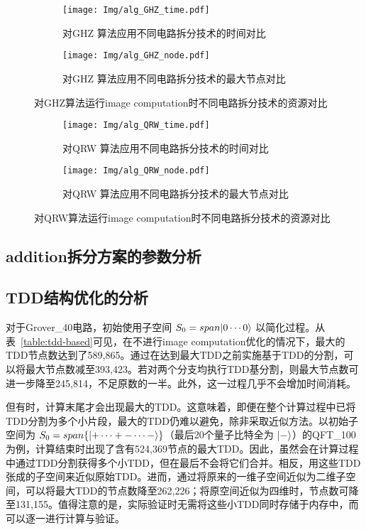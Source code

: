 \begin{figure}[!htbp]
    \centering
    \begin{subfigure}[b]{.4\textwidth}
        \centering
        \texttt{[image: Img/alg\_GHZ\_time.pdf]}
        \caption{对GHZ 算法应用不同电路拆分技术的时间对比}
        \label{fig:GHZ-time}
    \end{subfigure}
    \qquad
    \begin{subfigure}[b]{.4\textwidth}
        \centering
        \texttt{[image: Img/alg\_GHZ\_node.pdf]}
        \caption{对GHZ 算法应用不同电路拆分技术的最大节点对比}
        \label{fig:GHZ-node}
    \end{subfigure}
    \caption{对GHZ算法运行image computation时不同电路拆分技术的资源对比}
    \label{fig:GHZ-compare}
\end{figure}
\begin{figure}[!htbp]
    \centering
    \begin{subfigure}[b]{.4\textwidth}
        \centering
        \texttt{[image: Img/alg\_QRW\_time.pdf]}
        \caption{对QRW 算法应用不同电路拆分技术的时间对比}
        \label{fig:QRW-time}
    \end{subfigure}
    \qquad
    \begin{subfigure}[b]{.4\textwidth}
        \centering
        \texttt{[image: Img/alg\_QRW\_node.pdf]}
        \caption{对QRW 算法应用不同电路拆分技术的最大节点对比}
        \label{fig:QRW-node}
    \end{subfigure}
    \caption{对QRW算法运行image computation时不同电路拆分技术的资源对比}
    \label{fig:QRW-compare}
\end{figure}

\subsection*{addition拆分方案的参数分析}

\subsection*{TDD结构优化的分析}
对于Grover\_40电路，初始使用子空间 $S_0=span{\ket{0\cdots0}}$ 以简化过程。从表~\ref{table:tdd-based}可见，在不进行image computation优化的情况下，最大的TDD节点数达到了589,865。通过在达到最大TDD之前实施基于TDD的分割，可以将最大节点数减至393,423。若对两个分支均执行TDD基分割，则最大节点数可进一步降至245,814，不足原数的一半。此外，这一过程几乎不会增加时间消耗。
    
但有时，计算末尾才会出现最大的TDD。这意味着，即便在整个计算过程中已将TDD分割为多个小片段，最大的TDD仍难以避免，除非采取近似方法。以初始子空间为 $S_0=span\{\ket{+\cdots+ -\cdots -}\}$（最后20个量子比特全为 $\ket{-}$）的QFT\_100为例，计算结束时出现了含有524,369节点的最大TDD。因此，虽然会在计算过程中通过TDD分割获得多个小TDD，但在最后不会将它们合并。相反，用这些TDD张成的子空间来近似原始TDD。进而，通过将原来的一维子空间近似为二维子空间，可以将最大TDD的节点数降至262,226；将原空间近似为四维时，节点数可降至131,155。值得注意的是，实际验证时无需将这些小TDD同时存储于内存中，而可以逐一进行计算与验证。